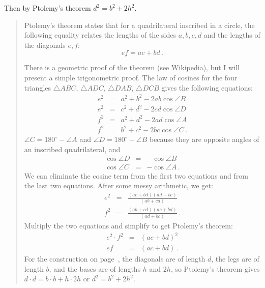 Then by Ptolemy’s theorem $d^2 = b^2 + 2h^2$.
\begin{quote}
Ptolemy's theorem states that for a quadrilateral inscribed in a circle, the following equality relates the lengths of the sides $a,b,c,d$ and the lengths of the diagonals $e,f$:
\[
ef = ac + bd\,.
\]
\begin{center}
\end{center}
There is a geometric proof of the theorem (see Wikipedia), but I will present a simple trigonometric proof. The law of cosines for the four triangles $\triangle ABC$, $\triangle ADC$, $\triangle DAB$, $\triangle DCB$ gives the following equations:
\begin{eqnarray*}
e^2 &=& a^2 + b^2 - 2ab \cos \angle B\\
e^2 &=& c^2 + d^2 - 2cd \cos \angle D\\
f^2 &=& a^2 + d^2 - 2ad \cos \angle A\\
f^2 &=& b^2 + c^2 - 2bc \cos \angle C\,.
\end{eqnarray*}
$\angle C = 180^\circ - \angle A$ and $\angle D = 180^\circ - \angle B$ because they are opposite angles of an inscribed quadrilateral, and
\begin{eqnarray*}
\cos \angle D &=& - \cos \angle B\\
\cos \angle C &=& -\cos \angle A\,.
\end{eqnarray*}
We can eliminate the cosine term from the first two equations and from the last two equations. After some messy arithmetic, we get:
\begin{eqnarray*}
e^2 &=& \frac{(ac+bd)(ad+bc)}{(ab+cd)}\\
f^2 &=& \frac{(ab+cd)(ac+bd)}{(ad+bc)}\,.
\end{eqnarray*}
Multiply the two equations and simplify to get Ptolemy's theorem:
\begin{eqnarray*}
e^2\cdot f^2 &=& (ac+bd)^2\\
ef &=& (ac+bd)\,. 
\end{eqnarray*}
For the construction on page~\pageref{ptolemy}, the diagonals are of length $d$, the legs are of length $b$, and the bases are of lengths $h$ and $2h$, so Ptolemy's theorem gives $d\cdot d = b\cdot b + h\cdot 2h$ or $d^2=b^2+2h^2$.
\end{quote}

